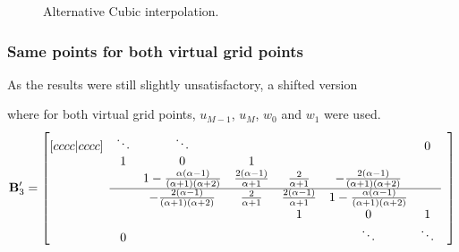 \documentclass[dvipsnames]{article}
\begin{document}
\begin{figure}[h]
    \centering
    \hspace{0.05\textwidth}
    \caption{Alternative Cubic interpolation.}\label{fig:altCubAddInCenter}
\end{figure}
\subsubsection*{Same points for both virtual grid points}
As the results were still slightly unsatisfactory, a shifted version 

where for both virtual grid points, $u_{M-1}$, $u_{M}$, $w_0$ and $w_1$ were used.
\begin{equation}
    \mathbf{B}_3' = \begin{bmatrix}[cccc|cccc]
     & \ddots  &\ddots & & & & 0 & \\
       & 1 & 0 & 1 & & & & \\
      & & 1-\frac{\alpha(\alpha - 1)}{(\alpha + 1)(\alpha + 2)}& \frac{2(\alpha - 1)}{\alpha + 1} & \frac{2}{\alpha + 1} & -\frac{2(\alpha - 1)}{(\alpha + 1)(\alpha + 2)} \\ \cline{2-7}
      & & -\frac{2(\alpha - 1)}{(\alpha + 1)(\alpha + 2)}  & \frac{2}{\alpha + 1} &  \frac{2(\alpha - 1)}{\alpha + 1} &  1-\frac{\alpha(\alpha - 1)}{(\alpha + 1)(\alpha + 2)} & & \\
         & & & &1 & 0 & 1  \\
         & 0 & &  &  &\ddots & \ddots &
    \end{bmatrix}
\end{equation}
\end{document}
